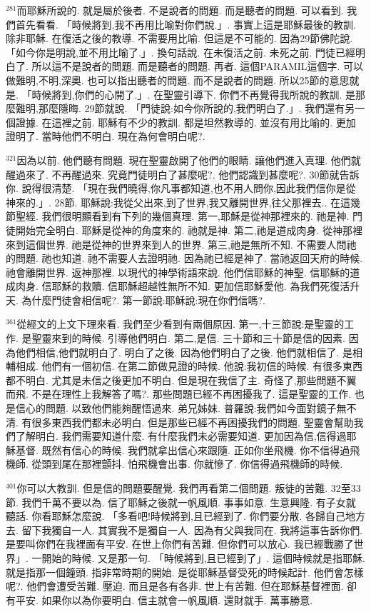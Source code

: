 \documentclass{book}
\begin{document}
$^{281}$而耶穌所說的.
就是屬於後者.
不是說者的問題.
而是聽者的問題.
可以看到.
我們首先看看.
「時候將到,我不再用比喻對你們說.」.
事實上這是耶穌最後的教訓.
除非耶穌.
在復活之後的教導.
不需要用比喻.
但這是不可能的.
因為29節佛陀說.
「如今你是明說,並不用比喻了.」.
換句話說.
在未復活之前.
未死之前.
門徒已經明白了.
所以這不是說者的問題.
而是聽者的問題.
再者.
這個PARAMIL這個字.
可以做難明,不明,深奧.
也可以指出聽者的問題.
而不是說者的問題.
所以25節的意思就是.
「時候將到,你們的心開了.」.
在聖靈引導下.
你們不再覺得我所說的教訓.
是那麼難明,那麼隱晦.
29節就說.
「門徒說:如今你所說的,我們明白了.」.
我們還有另一個證據.
在這裡之前.
耶穌有不少的教訓.
都是坦然教導的.
並沒有用比喻的.
更加證明了.
當時他們不明白.
現在為何會明白呢?.

$^{321}$因為以前.
他們聽有問題.
現在聖靈啟開了他們的眼睛.
讓他們進入真理.
他們就醒過來了.
不再醒過來.
究竟門徒明白了甚麼呢?.
他們認識到甚麼呢?.
30節就告訴你.
說得很清楚.
「現在我們曉得,你凡事都知道,也不用人問你,因此我們信你是從神來的.」.
28節.
耶穌說:我從父出來,到了世界,我又離開世界,往父那裡去..
在這幾節聖經.
我們很明顯看到有下列的幾個真理.
第一,耶穌是從神那裡來的.
祂是神.
門徒開始完全明白.
耶穌是從神的角度來的.
祂就是神.
第二,祂是道成肉身.
從神那裡來到這個世界.
祂是從神的世界來到人的世界.
第三,祂是無所不知.
不需要人問祂的問題.
祂也知道.
祂不需要人去證明祂.
因為祂已經是神了.
當祂返回天府的時候.
祂會離開世界.
返神那裡.
以現代的神學術語來說.
他們信耶穌的神聖.
信耶穌的道成肉身.
信耶穌的救贖.
信耶穌超越性無所不知.
更加信耶穌愛他.
為我們死復活升天.
為什麼門徒會相信呢?.
第一節說:耶穌說:現在你們信嗎?.

$^{361}$從經文的上文下理來看.
我們至少看到有兩個原因.
第一,十三節說:是聖靈的工作.
是聖靈來到的時候.
引導他們明白.
第二,是信.
三十節和三十節是信的因素.
因為他們相信,他們就明白了.
明白了之後.
因為他們明白了之後.
他們就相信了.
是相輔相成.
他們有一個初信.
在第二節做見證的時候.
他說:我初信的時候.
有很多東西都不明白.
尤其是未信之後更加不明白.
但是現在我信了主.
奇怪了,那些問題不翼而飛.
不是在理性上我解答了嗎?.
那些問題已經不再困擾我了.
這是聖靈的工作.
也是信心的問題.
以致他們能夠醒悟過來.
弟兄姊妹.
普羅說:我們如今面對鏡子無不清.
有很多東西我們都未必明白.
但是那些已經不再困擾我們的問題.
聖靈會幫助我們了解明白.
我們需要知道什麼.
有什麼我們未必需要知道.
更加因為信,信得過耶穌基督.
既然有信心的時候.
我們就拿出信心來跟隨.
正如你坐飛機.
你不信得過飛機師.
從頭到尾在那裡顫抖.
怕飛機會出事.
你就慘了.
你信得過飛機師的時候.

$^{401}$你可以大教訓.
但是信的問題要醒覺.
我們再看第二個問題.
叛徒的苦難.
32至33節.
我們千萬不要以為.
信了耶穌之後就一帆風順.
事事如意.
生意興隆.
有子女就聽話.
你看耶穌怎麼說.
「多看吧!時候將到,且已經到了.
你們要分散.
各歸自己地方去.
留下我獨自一人.
其實我不是獨自一人.
因為有父與我同在.
我將這事告訴你們.
是要叫你們在我裡面有平安.
在世上你們有苦難.
但你們可以放心.
我已經戰勝了世界」.
一開始的時候.
又是那一句.
「時候將到,且已經到了」.
這個時候就是指耶穌.
就是指那一個鐘頭.
指非常時期的開始.
是從耶穌基督受死的時候起計.
他們會怎樣呢?.
他們會遭受苦難.
壓迫.
而且是各有各非.
世上有苦難.
但在耶穌基督裡面.
卻有平安.
如果你以為你要明白.
信主就會一帆風順.
還財就手.
萬事勝意.
\end{document}
